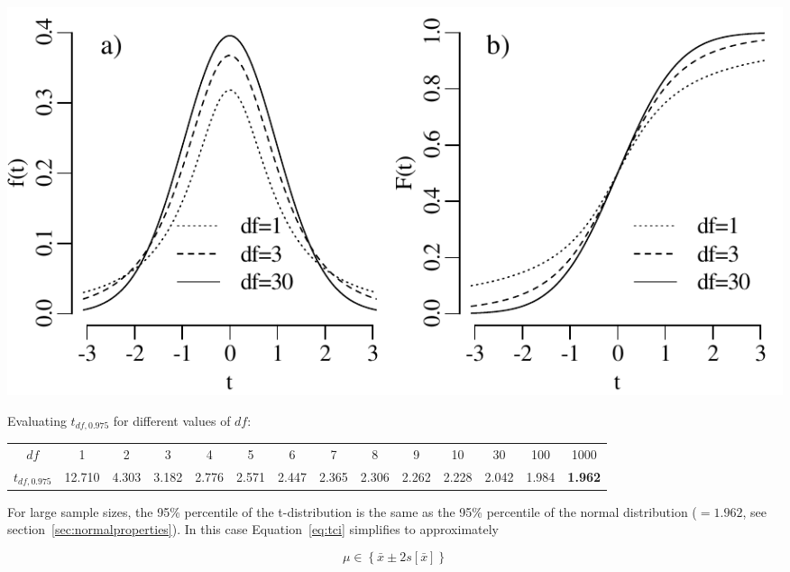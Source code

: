 \noindent\begin{minipage}[t][][b]{.6\textwidth}
  \includegraphics[width=\textwidth]{../figures/tdof.pdf}\\
\end{minipage}
\begin{minipage}[t][][t]{.4\textwidth}
  \label{fig:tdof}
\end{minipage}

Evaluating $t_{df,0.975}$ for different values of $df$:

\begin{center}
  \begin{tabular}{c|c@{\gap}c@{\gap}c@{\gap}c@{\gap}c@{\gap}c
      @{\gap}c@{\gap}c@{\gap}c@{\gap}c@{\gap}c@{\gap}c@{\gap}c}
    $df$ & 1 & 2 & 3 & 4 & 5 & 6 & 7 & 8 & 9 & 10 & 30 & 100 & 1000 \\
    $t_{df,0.975}$ &  12.710 & 4.303 & 3.182 & 2.776 & 2.571 &
    2.447 & 2.365 & 2.306 & 2.262 & 2.228 & 2.042 & 1.984 & \textbf{1.962}
  \end{tabular}
\end{center}

For large sample sizes, the 95\% percentile of the t-distribution is
the same as the 95\% percentile of the normal distribution ($=1.962$,
see section~\ref{sec:normalproperties}). In this case
Equation~\ref{eq:tci} simplifies to approximately

\[
\mu \in \left\{ \bar{x} \pm 2 s[\bar{x}] \right\}
\]

